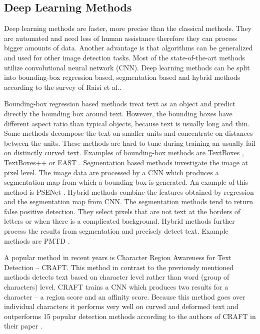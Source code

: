 \subsection*{Deep Learning Methods}

Deep learning methods are faster, more precise than the classical methods. They are automated and need less of human assistance therefore they can process bigger amounts of data. Another advantage is that algorithms can be generalized and used for other image detection tasks. Most of the state-of-the-art methods utilize convolutional neural network (CNN). Deep learning methods can be split into bounding-box regression based, segmentation based and hybrid methods according to the survey of Raisi et al.\cite{raisi2020text}.

Bounding-box regression based methods treat text as an object and predict directly the bounding box around text. However, the bounding boxes have different aspect ratio than typical objects, because text is usually long and thin. Some methods decompose the text on smaller units and concentrate on distances between the units. These methods are hard to tune during training an usually fail on distinctly curved text. Examples of bounding-box methods are TextBoxes \cite{liao2017textboxes}, TextBoxes++ \cite{liao2018textboxes++} or EAST \cite{zhou2017east}. Segmentation based methods investigate the image at pixel level. The image data are processed by a CNN which produces a segmentation map from which a bounding box is generated. An example of this method is PSENet \cite{wang2019shape}. Hybrid methods combine the features obtained by regression and the segmentation map from CNN. The segmentation methods tend to return false positive detection. They select pixels that are not text at the borders of letters or when there is a complicated background. Hybrid methods further process the results from segmentation and precisely detect text. Example methods are PMTD \cite{liu2019pyramid}.

A popular method in recent years is Character Region Awareness for Text Detection -- CRAFT. This method in contrast to the previously mentioned methods detects text based on character level rather than word (group of characters) level. CRAFT trains a CNN which produces two results for a character -- a region score and an affinity score. Because this method goes over individual characters it performs very well on curved and deformed text and outperforms 15 popular detection methods according to the authors of CRAFT in their paper \cite{craft2}.


